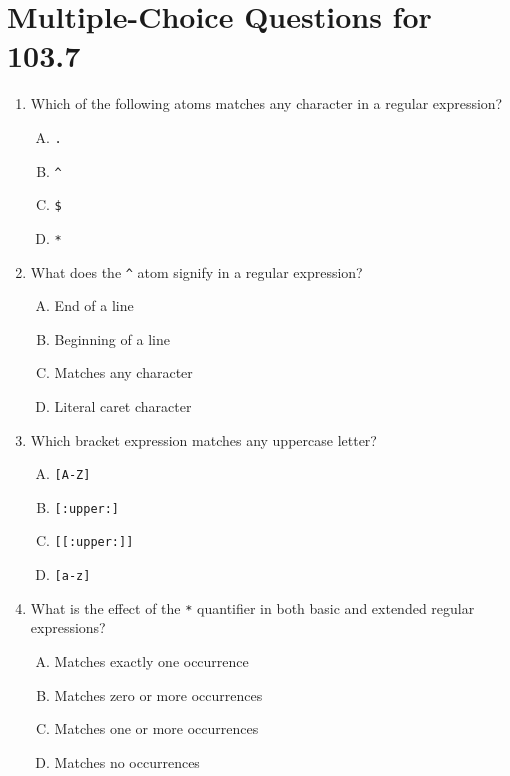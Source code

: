 \documentclass[a4paper]{report}
\begin{document}
\section*{Multiple-Choice Questions for 103.7}
\begin{enumerate}[1.]

    \item Which of the following atoms matches any character in a regular expression?  
    \begin{enumerate}[A)]
        \item \texttt{.}  
        \item \texttt{\^}  
        \item \texttt{\$}  
        \item \texttt{*}  
    \end{enumerate}

    \item What does the \texttt{\^} atom signify in a regular expression?  
    \begin{enumerate}[A)]
        \item End of a line  
        \item Beginning of a line  
        \item Matches any character  
        \item Literal caret character  
    \end{enumerate}

    \item Which bracket expression matches any uppercase letter?  
    \begin{enumerate}[A)]
        \item \texttt{[A-Z]}  
        \item \texttt{[:upper:]}  
        \item \texttt{[[:upper:]]}  
        \item \texttt{[a-z]}  
    \end{enumerate}

    \item What is the effect of the \texttt{*} quantifier in both basic and extended regular expressions?  
    \begin{enumerate}[A)]
        \item Matches exactly one occurrence  
        \item Matches zero or more occurrences  
        \item Matches one or more occurrences  
        \item Matches no occurrences  
    \end{enumerate}


\end{enumerate}
\end{document}
